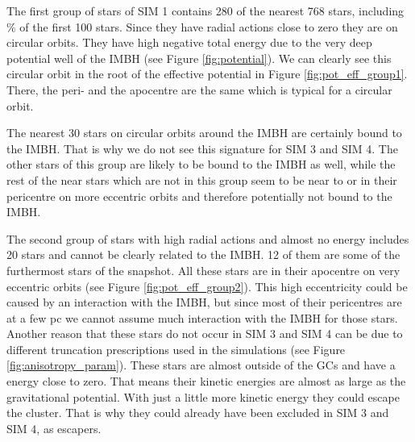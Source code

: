 \par The first group of stars of SIM 1 contains 280 of the nearest 768 stars, including \unit[85]{\%} of the first 100 stars. Since they have radial actions close to zero they are on circular orbits. They have high negative total energy due to the very deep potential well of the \ac{IMBH} (see Figure \ref{fig:potential}). We can clearly see this circular orbit in the root of the effective potential in Figure \ref{fig:pot_eff_group1}. There, the peri- and the apocentre are the same which is typical for a circular orbit. 
\par The nearest 30 stars on circular orbits around the \ac{IMBH} are certainly bound to the \ac{IMBH}. That is why we do not see this signature for SIM 3 and SIM 4. The other stars of this group are likely to be bound to the \ac{IMBH} as well, while the rest of the near stars which are not in this group seem to be near to or in their pericentre on more eccentric orbits and therefore potentially not bound to the \ac{IMBH}. 
\par The second group of stars with high radial actions and almost no energy includes 20 stars and cannot be clearly related to the \ac{IMBH}. 12 of them are some of  the furthermost stars of the snapshot. All these stars are in their apocentre on very eccentric orbits (see Figure \ref{fig:pot_eff_group2}). This high eccentricity could be caused by an interaction with the \ac{IMBH}, but since most of their pericentres are at a few pc we cannot assume much interaction with the \ac{IMBH} for those stars. Another reason that these stars do not occur in SIM 3 and SIM 4 can be due to different truncation prescriptions used in the simulations (see Figure \ref{fig:anisotropy_param}). These stars are almost outside of the \acp{GC} and have a energy close to zero. That means their kinetic energies are almost as large as the gravitational potential. With just a little more kinetic energy they could escape the cluster. That is why they could already have been excluded in SIM 3 and SIM 4, as escapers. 

